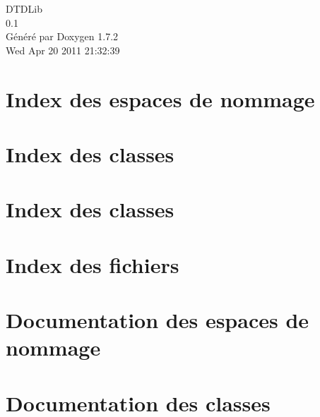 \documentclass[a4paper]{book}
\begin{document}
\hypersetup{pageanchor=false}
\begin{titlepage}
\vspace*{7cm}
\begin{center}
{\Large DTDLib \\[1ex]\large 0.1 }\\
\vspace*{1cm}
{\large Généré par Doxygen 1.7.2}\\
\vspace*{0.5cm}
{\small Wed Apr 20 2011 21:32:39}\\
\end{center}
\end{titlepage}
\clearemptydoublepage
{}
\tableofcontents
\clearemptydoublepage
{}
\hypersetup{pageanchor=true}
\chapter{Index des espaces de nommage}

\chapter{Index des classes}

\chapter{Index des classes}

\chapter{Index des fichiers}

\chapter{Documentation des espaces de nommage}

\chapter{Documentation des classes}























\end{document}
